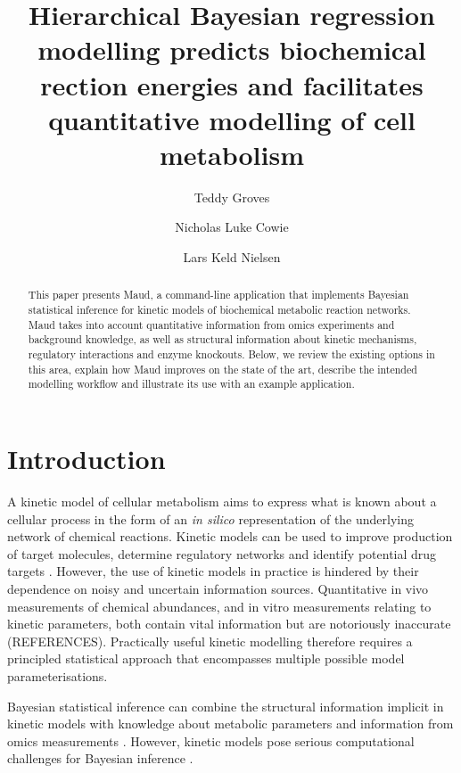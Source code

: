 \documentclass[journal=,manuscript=]{achemso}
\author{Teddy Groves}
\affiliation{ DTU Biosustain,  }
\author{Nicholas Luke Cowie}
\affiliation{ DTU Biosustain,  }
\author{Lars Keld Nielsen}
\affiliation{ DTU Biosustain,  }
\title[]{Hierarchical Bayesian regression modelling predicts biochemical
rection energies and facilitates quantitative modelling of cell
metabolism}
\renewcommand*\contentsname{Table of contents}
\newcommand\contentsname{Table of contents}
\begin{document}
\maketitle
\begin{abstract}
This paper presents Maud, a command-line application that implements
Bayesian statistical inference for kinetic models of biochemical
metabolic reaction networks. Maud takes into account quantitative
information from omics experiments and background knowledge, as well as
structural information about kinetic mechanisms, regulatory interactions
and enzyme knockouts. Below, we review the existing options in this
area, explain how Maud improves on the state of the art, describe the
intended modelling workflow and illustrate its use with an example
application.
\end{abstract}
\ifdefined\Shaded\renewenvironment{Shaded}{\begin{tcolorbox}[sharp corners, boxrule=0pt, borderline west={3pt}{0pt}{shadecolor}, enhanced, breakable, frame hidden, interior hidden]}{\end{tcolorbox}}\fi

\renewcommand*\contentsname{Table of contents}
{
\hypersetup{linkcolor=}
\setcounter{tocdepth}{3}
\tableofcontents
}
\hypertarget{introduction}{%
\section{Introduction}\label{introduction}}

A kinetic model of cellular metabolism aims to express what is known
about a cellular process in the form of an \emph{in silico}
representation of the underlying network of chemical reactions. Kinetic
models can be used to improve production of target molecules, determine
regulatory networks \citep{christodoulou_reserve_2018} and identify
potential drug targets
\citep{deberardinis_fundamentals_2016, Liberti2017}. However, the use of
kinetic models in practice is hindered by their dependence on noisy and
uncertain information sources. Quantitative in vivo measurements of
chemical abundances, and in vitro measurements relating to kinetic
parameters, both contain vital information but are notoriously
inaccurate (REFERENCES). Practically useful kinetic modelling therefore
requires a principled statistical approach that encompasses multiple
possible model parameterisations.

Bayesian statistical inference can combine the structural information
implicit in kinetic models with knowledge about metabolic parameters and
information from omics measurements
\citep{saa_construction_2016, gopalakrishnan_k-fit_2020}. However,
kinetic models pose serious computational challenges for Bayesian
inference \citep{gutenkunst_2007, raue_identifiability_2010}.
\end{document}
